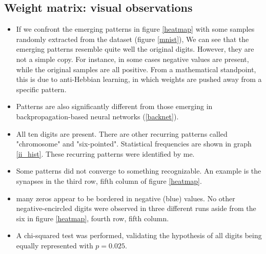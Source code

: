 \documentclass[a4paper]{report}
\begin{document}
\subsection{Weight matrix: visual observations}

\begin{itemize}
    \item If we confront the emerging patterns in figure \ref{heatmap} with some samples randomly extracted from the dataset (figure \ref{mnist}), We can see that the emerging patterns resemble quite well the original digits. However, they are not a simple copy. For instance, in some cases negative values are present, while the original samples are all positive. From a mathematical standpoint, this is due to anti-Hebbian learning, in which weights are pushed away from a specific pattern.
    \item Patterns are also significantly different from those emerging in backpropagation-based neural networks (\ref{backnet}).
    \item All ten digits are present. There are other recurring patterns called "chromosome" and "six-pointed". Statistical frequencies are shown in graph \ref{ii_hist}. These recurring patterns were identified by me.
    \item Some patterns did not converge to something recognizable. An example is the synapses in the third row, fifth column of figure \ref{heatmap}.
    \item many zeros appear to be bordered in negative (blue) values. No other negative-encircled digits were observed in three different runs aside from the six in figure \ref{heatmap}, fourth row, fifth column.
    \item A chi-squared test was performed, validating the hypothesis of all digits being equally represented with $p  = 0.025$.
    \end{itemize}
\end{document}
